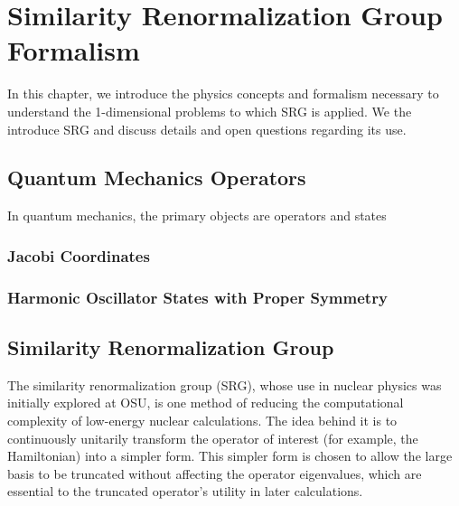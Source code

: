 \chapter{Similarity Renormalization Group Formalism}

In this chapter, we introduce the physics concepts and formalism necessary to understand the 1-dimensional problems to which SRG is applied. We the introduce SRG and discuss details and open questions regarding its use.

\section{Quantum Mechanics Operators}

In quantum mechanics, the primary objects are operators and states

\subsection{Jacobi Coordinates}

\subsection{Harmonic Oscillator States with Proper Symmetry}

\section{Similarity Renormalization Group}

The similarity renormalization group (SRG), whose use in nuclear physics was initially explored at OSU, is one method of reducing the computational complexity of low-energy nuclear calculations. The idea behind it is to continuously unitarily transform the operator of interest (for example, the Hamiltonian) into a simpler form. This simpler form is chosen to allow the large basis to be truncated without affecting the operator eigenvalues, which are essential to the truncated operator's utility in later calculations.